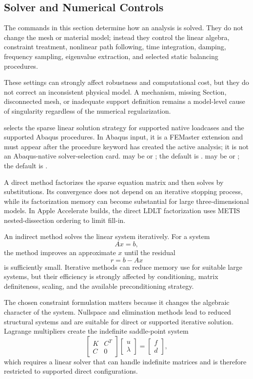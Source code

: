 \subsection{Solver and Numerical Controls}
\label{sec:numerical-controls}

The commands in this section determine how an analysis is solved. They do not change the mesh or material model; instead they control the linear algebra, constraint treatment, nonlinear path following, time integration, damping, frequency sampling, eigenvalue extraction, and selected static balancing procedures.

These settings can strongly affect robustness and computational cost, but they do not correct an inconsistent physical model. A mechanism, missing Section, disconnected mesh, or inadequate support definition remains a model-level cause of singularity regardless of the numerical regularization.


 selects the sparse linear solution strategy for supported native loadcases and the supported Abaqus  procedures. In Abaqus input, it is a FEMaster extension and must appear after the procedure keyword has created the active analysis; it is not an Abaqus-native solver-selection card.  may be  or ; the default is .  may be  or ; the default is .

A direct method factorizes the sparse equation matrix and then solves by substitutions. Its convergence does not depend on an iterative stopping process, while its factorization memory can become substantial for large three-dimensional models. In Apple Accelerate builds, the direct LDLT factorization uses METIS nested-dissection ordering to limit fill-in.

An indirect method solves the linear system iteratively. For a system
\[
A x=b,
\]
the method improves an approximate \(x\) until the residual
\[
r=b-Ax
\]
is sufficiently small. Iterative methods can reduce memory use for suitable large systems, but their efficiency is strongly affected by conditioning, matrix definiteness, scaling, and the available preconditioning strategy.

The chosen constraint formulation matters because it changes the algebraic character of the system. Nullspace and elimination methods lead to reduced structural systems and are suitable for direct or supported iterative solution. Lagrange multipliers create the indefinite saddle-point system
\[
\begin{bmatrix}
K&C^T\\
C&0
\end{bmatrix}
\begin{bmatrix}u\\\lambda\end{bmatrix}
=
\begin{bmatrix}f\\d\end{bmatrix},
\]
which requires a linear solver that can handle indefinite matrices and is therefore restricted to supported direct configurations.


